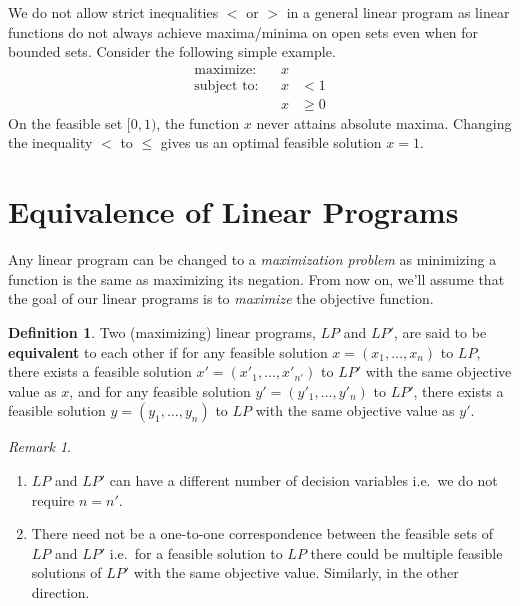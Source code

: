 \documentclass[
]{book}
\providecommand{\tightlist}{%
  \setlength{\itemsep}{0pt}\setlength{\parskip}{0pt}}
\theoremstyle{definition}
\newtheorem{definition}{Definition}[chapter]
\theoremstyle{definition}
\theoremstyle{definition}
\theoremstyle{definition}
\theoremstyle{remark}
\newtheorem*{remark}{Remark}
\begin{document}
We do not allow strict inequalities \(<\) or \(>\) in a general linear program as linear functions do not always achieve maxima/minima on open sets even when for bounded sets. Consider the following simple example.
\begin{align*}
  \mbox{maximize:} && x \\
  \mbox{subject to:} 
  && x &< 1 \\
  && x &\ge 0
\end{align*}
On the feasible set \([0, 1)\), the function \(x\) never attains absolute maxima.
Changing the inequality \(<\) to \(\leq\) gives us an optimal feasible solution \(x = 1\).

\hypertarget{equivalence-of-linear-programs}{%
\section{Equivalence of Linear Programs}\label{equivalence-of-linear-programs}}

Any linear program can be changed to a \emph{maximization problem} as minimizing a function is the same as maximizing its negation. From now on, we'll assume that the goal of our linear programs is to \emph{maximize} the objective function.

\begin{definition}
Two (maximizing) linear programs, \(LP\) and \(LP'\), are said to be \textbf{equivalent} to each other if for any feasible solution \(x = (x_1, \dots, x_n)\) to \(LP\), there exists a feasible solution \(x' = (x'_1, \dots, x'_{n'})\) to \(LP'\) with the same objective value as \(x\), and for any feasible solution \(y' = (y'_1, \dots, y'_n)\) to \(LP'\), there exists a feasible solution \(y = (y_1, \dots, y_{n})\) to \(LP\) with the same objective value as \(y'\).
\end{definition}

\begin{remark}

~

\begin{enumerate}
\def\labelenumi{\arabic{enumi}.}
\tightlist
\item
  \(LP\) and \(LP'\) can have a different number of decision variables i.e.~we do not require \(n = n'.\)
\item
  There need not be a one-to-one correspondence between the feasible sets of \(LP\) and \(LP'\) i.e.~for a feasible solution to \(LP\) there could be multiple feasible solutions of \(LP'\) with the same objective value. Similarly, in the other direction.
\end{enumerate}

\end{remark}
\end{document}
